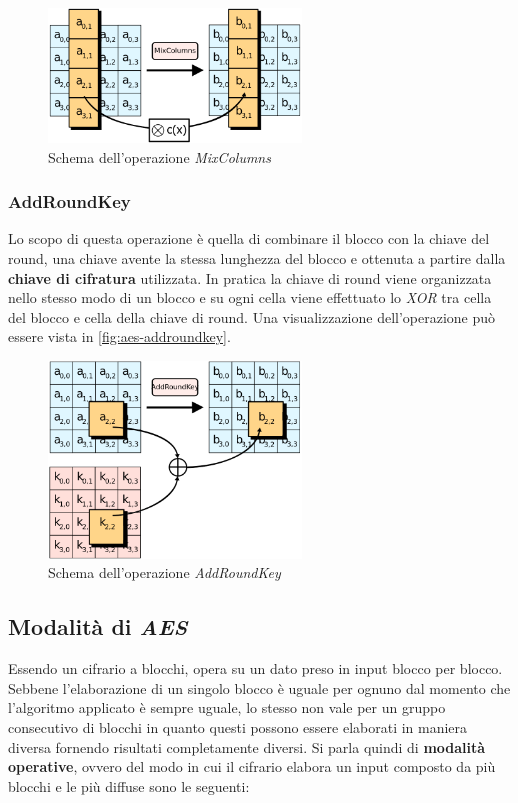 \begin{figure}[h]
    \centering
    \includegraphics[width=0.6\textwidth]{capitoli/figure-crittografia/aes-MixColumns.png}
    \caption{Schema dell'operazione \emph{MixColumns}}
    \label{fig:aes-mixcolumns}
\end{figure}

\subsubsection{AddRoundKey}
Lo scopo di questa operazione è quella di combinare il blocco con la chiave del round, una chiave avente la stessa lunghezza del blocco e ottenuta a partire dalla \textbf{chiave di cifratura} utilizzata. In pratica la chiave di round viene organizzata nello stesso modo di un blocco e su ogni cella viene effettuato lo \emph{XOR} tra cella del blocco e cella della chiave di round. Una visualizzazione dell'operazione può essere vista in \autoref{fig:aes-addroundkey}. \cite{wikipedia_aes}

\begin{figure}[h]
    \centering
    \includegraphics[width=0.6\textwidth]{capitoli/figure-crittografia/aes-AddRoundKey.png}
    \caption{Schema dell'operazione \emph{AddRoundKey}}
    \label{fig:aes-addroundkey}
\end{figure}

\subsection{Modalità di \emph{AES}} \label{section:aes-modes}
Essendo un cifrario a blocchi, opera su un dato preso in input blocco per blocco. Sebbene l'elaborazione di un singolo blocco è uguale per ognuno dal momento che l'algoritmo applicato è sempre uguale, lo stesso non vale per un gruppo consecutivo di blocchi in quanto questi possono essere elaborati in maniera diversa fornendo risultati completamente diversi. Si parla quindi di \textbf{modalità operative}, ovvero del modo in cui il cifrario elabora un input composto da più blocchi e le più diffuse sono le seguenti:

